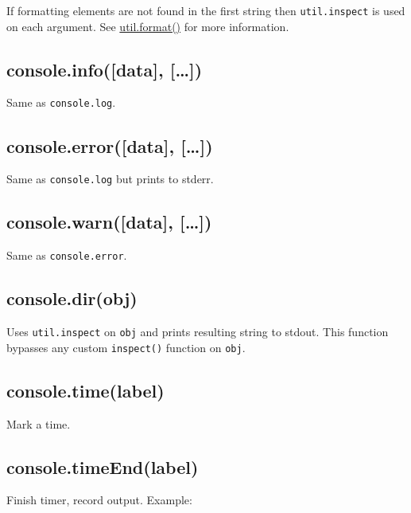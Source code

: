 If formatting elements are not found in the first string then
\texttt{util.inspect} is used on each argument. See
\href{util.html\#util\_util\_format\_format}{util.format()} for more
information.

\subsection{console.info({[}data{]}, {[}\ldots{}{]})}

Same as \texttt{console.log}.

\subsection{console.error({[}data{]}, {[}\ldots{}{]})}

Same as \texttt{console.log} but prints to stderr.

\subsection{console.warn({[}data{]}, {[}\ldots{}{]})}

Same as \texttt{console.error}.

\subsection{console.dir(obj)}

Uses \texttt{util.inspect} on \texttt{obj} and prints resulting string
to stdout. This function bypasses any custom \texttt{inspect()} function
on \texttt{obj}.

\subsection{console.time(label)}

Mark a time.

\subsection{console.timeEnd(label)}

Finish timer, record output. Example:

\begin{Shaded}
\begin{Highlighting}[]
\NormalTok{(}\NormalTok{);}
 \NormalTok{(} 
  \NormalTok{;}
\NormalTok{\}}
\NormalTok{(}\NormalTok{);}
\end{Highlighting}
\end{Shaded}

